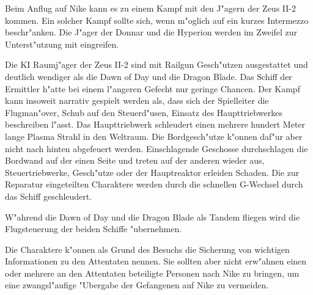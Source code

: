 \begin{remarks}
	Beim Anflug auf Nike kann es zu einem Kampf mit den J"agern der Zeus II-2 kommen. Ein solcher Kampf sollte sich, wenn m"oglich auf ein kurzes Intermezzo beschr"anken. Die J"ager der Donnar und die Hyperion werden im Zweifel zur Unterst"utzung mit eingreifen. 
	
	Die KI Raumj"ager der Zeus II-2 sind mit Railgun Gesch"utzen ausgestattet und deutlich wendiger als die Dawn of Day und die Dragon Blade. Das Schiff der Ermittler h"atte bei einem l"angeren Gefecht nur geringe Chancen. Der Kampf kann insoweit narrativ gespielt werden als, dass sich der Spielleiter die Flugman"over, Schub auf den Steuerd"usen, Einsatz des Haupttriebwerkes beschreiben l"asst. Das Haupttriebwerk schleudert einen mehrere hundert Meter lange Plasma Strahl in den Weltraum. Die Bordgesch"utze k"onnen daf"ur aber nicht nach hinten abgefeuert werden. Einschlagende Geschosse durchschlagen die Bordwand auf der einen Seite und treten auf der anderen wieder aus, Steuertriebwerke, Gesch"utze oder der Hauptreaktor erleiden Schaden. Die zur Reparatur eingeteilten Charaktere werden durch die schnellen G-Wechsel durch das Schiff geschleudert.

	W"ahrend die Dawn of Day und die Dragon Blade als Tandem fliegen wird \xl{} die Flugsteuerung der beiden Schiffe "ubernehmen.

	Die Charaktere k"onnen als Grund des Besuchs die Sicherung von wichtigen Informationen zu den Attentaten nennen. Sie sollten aber nicht erw"ahnen einen oder mehrere an den Attentaten beteiligte Personen nach Nike zu bringen, um eine zwangsl"aufige "Ubergabe der Gefangenen auf Nike zu vermeiden.
\end{remarks}
\newpage

